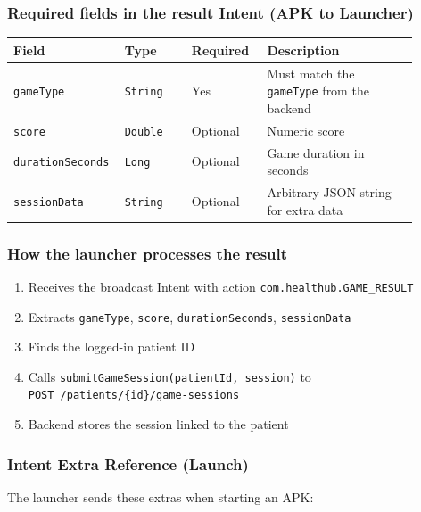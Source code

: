 \subsubsection{Required fields in the result Intent (APK to Launcher)}\label{required-fields-in-the-result-intent-apk-launcher}

\begin{longtable}{p{0.20\linewidth}p{0.16\linewidth}p{0.18\linewidth}p{0.36\linewidth}}
\toprule
Field & Type & Required & Description \\
\midrule
\endhead
\bottomrule
\endlastfoot
\texttt{gameType} & \texttt{String} & Yes & Must match the \texttt{gameType} from the backend \\
\texttt{score} & \texttt{Double} & Optional & Numeric score \\
\texttt{durationSeconds} & \texttt{Long} & Optional & Game duration in seconds \\
\texttt{sessionData} & \texttt{String} & Optional & Arbitrary JSON string for extra data \\
\end{longtable}

\subsubsection{How the launcher processes the
result}\label{how-the-launcher-processes-the-result}

\begin{enumerate}
\def\labelenumi{\arabic{enumi}.}
\tightlist
\item
  Receives the broadcast Intent with action
  \texttt{com.healthub.GAME\_RESULT}
\item
  Extracts \texttt{gameType}, \texttt{score}, \texttt{durationSeconds},
  \texttt{sessionData}
\item
  Finds the logged-in patient ID
\item
  Calls \texttt{submitGameSession(patientId,\ session)} to
\texttt{POST\ /patients/\{id\}/game-sessions}
\item
  Backend stores the session linked to the patient
\end{enumerate}

\subsubsection{Intent Extra Reference
(Launch)}\label{intent-extra-reference-launch}

The launcher sends these extras when starting an APK:

